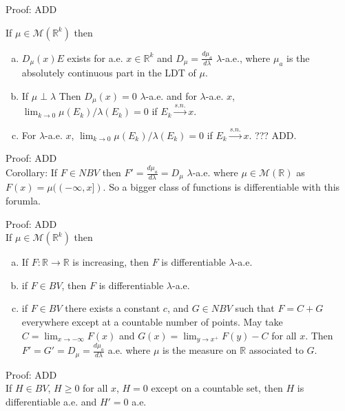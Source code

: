 \documentclass[12pt]{article}
\newcommand{\reals}[0] { \mathbb{R}}
\newcommand{\M}[0] { \mathcal{M} }
\newcommand{\rarw}[0] { \rightarrow }
\begin{document}
\vspace{0.5in}

\noindent
Proof: ADD \\


\break




If $\mu \in \M(\reals^k)$ then
\begin{enumerate}[a)]
\item
$D_\mu(x)E$ exists for a.e. $x \in \reals^k$ and $D_\mu = \frac{d\mu_a}{d\lambda}$ $\lambda$-a.e., where $\mu_a$ is the absolutely continuous part in the LDT of $\mu$.
\item
If $\mu \perp \lambda$ Then $D_\mu(x) = 0$ $\lambda$-a.e. and for $\lambda$-a.e. $x$, $\lim_{k \rarw 0} \mu(E_k) / \lambda(E_k) = 0$ if $E_k \overset{s.n.}{\rarw} x$.
\item
For $\lambda$-a.e. $x$, $\lim_{k \rarw 0} \mu(E_k) / \lambda(E_k) = 0$ if $E_k \overset{s.n.}{\rarw} x$. ??? ADD.
\end{enumerate}



\noindent
Proof: ADD \\

Corollary: If $F \in NBV$ then $F' = \frac{d\mu_a}{d\lambda} = D_\mu$ $\lambda$-a.e. where $\mu \in \M(\reals)$ as $F(x) = \mu((-\infty,x])$. So a bigger class of functions is differentiable with this forumla.

\noindent
Proof: ADD \\



If $\mu \in \M(\reals^k)$ then
\begin{enumerate}[a)]
\item
If $F: \reals \rarw \reals$ is increasing, then $F$ is differentiable $\lambda$-a.e.
\item
if $F \in BV$, then $F$ is differentiable $\lambda$-a.e.
\item
if $F \in BV$  there exists a constant $c$, and $G \in NBV$ such that $F = C + G$ everywhere except at a countable number of points. May take $C = \lim_{x \rarw - \infty}  F(x)$ and $G(x) = \lim_{ y \rarw x^+} F(y) - C$ for all $x$. Then $F' = G' = D_\mu = \frac{d\mu_a}{d\lambda}$ a.e. where $\mu$ is the measure on $\reals$ associated to $G$.
\end{enumerate}


\noindent
Proof: ADD \\


If $H \in BV$, $H \ge 0$ for all $x$, $H = 0$ except on a countable set, then $H$ is differentiable a.e. and $H' = 0$ a.e.
\end{document}

